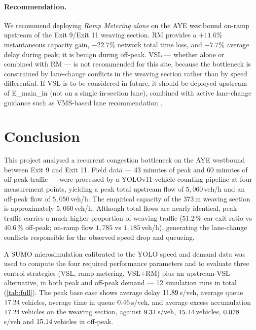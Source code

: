 \documentclass[11pt,a4paper]{article}
\begin{document}
\paragraph{Recommendation.}
We recommend deploying \emph{Ramp Metering alone} on the AYE westbound on-ramp upstream of the Exit 9/Exit 11 weaving section. RM provides a $+11.6\%$ instantaneous capacity gain, $-22.7\%$ network total time loss, and $-7.7\%$ average delay during peak; it is benign during off-peak. VSL --- whether alone or combined with RM --- is not recommended for this site, because the bottleneck is constrained by lane-change conflicts in the weaving section rather than by speed differential. If VSL is to be considered in future, it should be deployed upstream of E\_main\_in (not on a single in-section lane), combined with active lane-change guidance such as VMS-based lane recommendation \cite{vsl:grumert_tapani_2018,vsl:abdelaty_2017}.

\section{Conclusion}
\label{sec:conclusion}

This project analysed a recurrent congestion bottleneck on the AYE westbound between Exit 9 and Exit 11. Field data --- 43 minutes of peak and 60 minutes of off-peak traffic --- were processed by a YOLOv11 vehicle-counting pipeline at four measurement points, yielding a peak total upstream flow of $5{,}060$\,veh/h and an off-peak flow of $5{,}050$\,veh/h. The empirical capacity of the $373$\,m weaving section is approximately $5{,}060$\,veh/h. Although total flows are nearly identical, peak traffic carries a much higher proportion of weaving traffic (51.2\,\% car exit ratio vs 40.6\,\% off-peak; on-ramp flow $1{,}785$ vs $1{,}185$\,veh/h), generating the lane-change conflicts responsible for the observed speed drop and queueing.

A SUMO microsimulation calibrated to the YOLO speed and demand data was used to compute the four required performance parameters and to evaluate three control strategies (VSL, ramp metering, VSL$+$RM) plus an upstream-VSL alternative, in both peak and off-peak demand --- 12 simulation runs in total (\cref{tab:full}). The peak base case shows average delay $11.89$\,s/veh, average queue $17.24$\,vehicles, average time in queue $0.46$\,s/veh, and average excess accumulation $17.24$\,vehicles on the weaving section, against $9.31$\,s/veh, $15.14$\,vehicles, $0.078$\,s/veh and $15.14$\,vehicles in off-peak.
\end{document}
